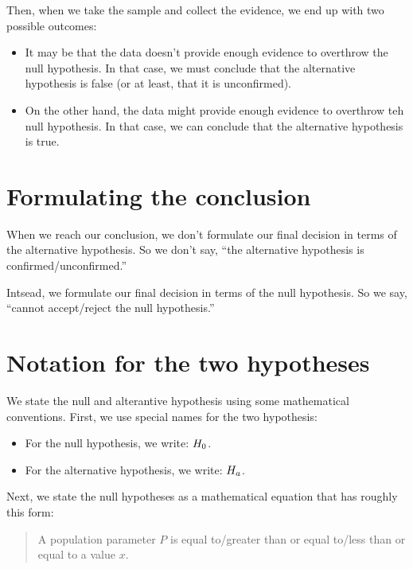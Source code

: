 \documentclass[../../../main.tex]{subfiles}
\begin{document}
Then, when we take the sample and collect the evidence, we end up with two possible outcomes:

\begin{itemize}
  \item It may be that the data doesn't provide enough evidence to overthrow the null hypothesis. In that case, we must conclude that the alternative hypothesis is false (or at least, that it is unconfirmed). 
  \item On the other hand,  the data might provide enough evidence to overthrow teh null hypothesis. In that case, we can conclude that the alternative hypothesis is true. 
\end{itemize}


\section{Formulating the conclusion}

When we reach our conclusion, we don't formulate our final decision in terms of the alternative hypothesis. So we don't say, ``the alternative hypothesis is confirmed/unconfirmed.''

Intsead, we formulate our final decision in terms of the null hypothesis. So we say, ``cannot accept/reject the null hypothesis.''


\section{Notation for the two hypotheses}

We state the null and alterantive hypothesis using some mathematical conventions. First, we use special names for the two hypothesis:

\begin{itemize}
  \item For the null hypothesis, we write: $\NullHyp/$.
  \item For the alternative hypothesis, we write: $\AltHyp/$.
\end{itemize}

\noindent
Next, we state the null hypotheses as a mathematical equation that has roughly this form:

\begin{quote}
  A population parameter $P$ is equal to/greater than or equal to/less than or equal to a value $x$.
\end{quote}
\end{document}
